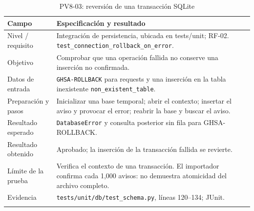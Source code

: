 \begin{table}[H]
\centering\small{}
\caption{PV8-03: reversión de una transacción SQLite}
\begin{tabularx}{\textwidth}{P{3.5cm}Y}
\toprule
\textbf{Campo} & \textbf{Especificación y resultado} \\
\midrule
Nivel / requisito & Integración de persistencia, ubicada en tests/unit; RF-02. \texttt{test\_\allowbreak connection\_\allowbreak rollback\_\allowbreak on\_\allowbreak error}. \\
\addlinespace
Objetivo & Comprobar que una operación fallida no conserve una inserción no confirmada. \\
\addlinespace
Datos de entrada & \texttt{GHSA-\allowbreak ROLLBACK} para requests y una inserción en la tabla inexistente \texttt{non\_\allowbreak existent\_\allowbreak table}. \\
\addlinespace
Preparación y pasos & Inicializar una base temporal; abrir el contexto; insertar el aviso y provocar el error; reabrir la base y buscar el aviso. \\
\addlinespace
Resultado esperado & \texttt{DatabaseError} y consulta posterior sin fila para GHSA-ROLLBACK. \\
\addlinespace
Resultado obtenido & Aprobado; la inserción de la transacción fallida se revierte. \\
\addlinespace
Límite de la prueba & Verifica el contexto de una transacción. El importador confirma cada 1,000 avisos: no demuestra atomicidad del archivo completo. \\
\addlinespace
Evidencia & \texttt{tests/\allowbreak unit/\allowbreak db/\allowbreak test\_\allowbreak schema.\allowbreak py}, líneas 120--134; JUnit. \\
\addlinespace
\bottomrule
\end{tabularx}
\end{table}
